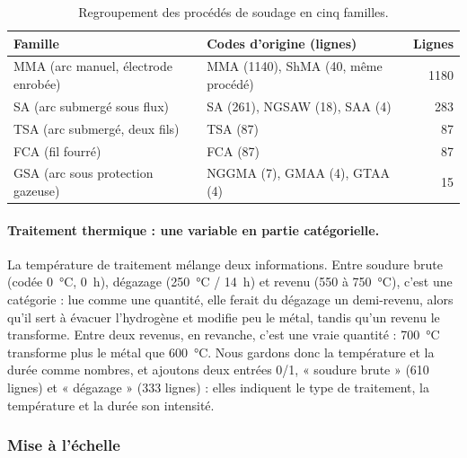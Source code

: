 \begin{table}[!htbp]
  \centering\small
  \begin{tabular}{@{}l l r@{}}
    \toprule
    \textbf{Famille} & \textbf{Codes d'origine (lignes)} & \textbf{Lignes} \\
    \midrule
    MMA (arc manuel, électrode enrobée) & MMA (1140), ShMA (40, même procédé) & 1180 \\
    SA (arc submergé sous flux)         & SA (261), NGSAW (18), SAA (4)       & 283 \\
    TSA (arc submergé, deux fils)       & TSA (87)                            & 87 \\
    FCA (fil fourré)                    & FCA (87)                            & 87 \\
    GSA (arc sous protection gazeuse)   & NGGMA (7), GMAA (4), GTAA (4)       & 15 \\
    \bottomrule
  \end{tabular}
  \caption{Regroupement des procédés de soudage en cinq familles.}
  \label{tab:procedes}
\end{table}

\paragraph{Traitement thermique : une variable en partie catégorielle.} La température
de traitement mélange deux informations. Entre soudure brute (codée \SI{0}{\celsius},
\SI{0}{\hour}), dégazage (\SI{250}{\celsius} / \SI{14}{\hour}) et revenu (550 à
\SI{750}{\celsius}), c'est une catégorie : lue comme une quantité, elle ferait du
dégazage un demi-revenu, alors qu'il sert à évacuer l'hydrogène et modifie peu le métal,
tandis qu'un revenu le transforme. Entre deux revenus, en revanche, c'est une vraie
quantité : \SI{700}{\celsius} transforme plus le métal que \SI{600}{\celsius}. Nous
gardons donc la température et la durée comme nombres, et ajoutons deux entrées 0/1,
« soudure brute » (610 lignes) et « dégazage » (333 lignes) : elles indiquent le type
de traitement, la température et la durée son intensité.


\subsubsection{Mise à l'échelle}

